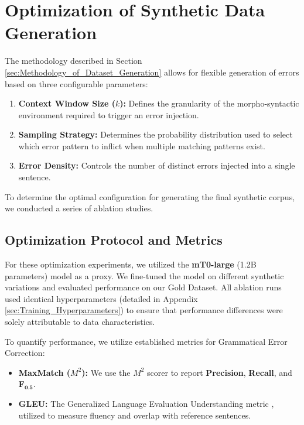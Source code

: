 \documentclass[11pt]{article}
\begin{document}
\section{Optimization of Synthetic Data Generation}
\label{sec:Optimization}

The methodology described in Section \ref{sec:Methodology_of_Dataset_Generation} allows for flexible generation of errors based on three configurable parameters:
\begin{enumerate}
    \item \textbf{Context Window Size ($k$):} Defines the granularity of the morpho-syntactic environment required to trigger an error injection.
    \item \textbf{Sampling Strategy:} Determines the probability distribution used to select which error pattern to inflict when multiple matching patterns exist.
    \item \textbf{Error Density:} Controls the number of distinct errors injected into a single sentence.
\end{enumerate}
To determine the optimal configuration for generating the final synthetic corpus, we conducted a series of ablation studies.

\subsection{Optimization Protocol and Metrics}
\label{sec:Opt_Protocol}
For these optimization experiments, we utilized the \textbf{mT0-large} (1.2B parameters) \cite{muennighoff2022crosslingual} model as a proxy. We fine-tuned the model on different synthetic variations and evaluated performance on our Gold Dataset. All ablation runs used identical hyperparameters (detailed in Appendix \ref{sec:Training_Hyperparameters}) to ensure that performance differences were solely attributable to data characteristics.

To quantify performance, we utilize established metrics \cite{yuan-2016} for Grammatical Error Correction:
\begin{itemize}
    \setlength{\itemsep}{0pt}
    \setlength{\parskip}{0pt}
    \item \textbf{MaxMatch ($M^2$):} We use the $M^2$ scorer \cite{dahlmeier-ng-2012-better} to report \textbf{Precision}, \textbf{Recall}, and \textbf{F$_{\textbf{0.5}}$}.
    \item \textbf{GLEU:} The Generalized Language Evaluation Understanding metric \cite{napoles2015gleu}, utilized to measure fluency and overlap with reference sentences.
\end{itemize}
\end{document}
